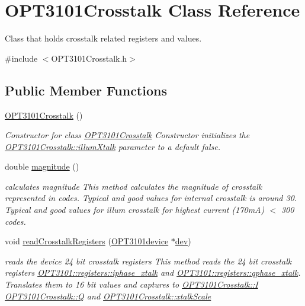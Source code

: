 \hypertarget{class_o_p_t3101_crosstalk}{}\section{O\+P\+T3101\+Crosstalk Class Reference}
\label{class_o_p_t3101_crosstalk}


Class that holds crosstalk related registers and values.  




{\ttfamily \#include $<$O\+P\+T3101\+Crosstalk.\+h$>$}

\subsection*{Public Member Functions}
\begin{DoxyCompactItemize}
\item 
\mbox{\hyperlink{class_o_p_t3101_crosstalk_ad983772d96c500ea16d5aa01dd03ce6d}{O\+P\+T3101\+Crosstalk}} ()
\begin{DoxyCompactList}\small\item\em Constructor for class \mbox{\hyperlink{class_o_p_t3101_crosstalk}{O\+P\+T3101\+Crosstalk}} Constructor initializes the \mbox{\hyperlink{class_o_p_t3101_crosstalk_ac34c766af7381d501b1716fd8a0076db}{O\+P\+T3101\+Crosstalk\+::illum\+Xtalk}} parameter to a default false. \end{DoxyCompactList}\item 
double \mbox{\hyperlink{class_o_p_t3101_crosstalk_acb6217116c652bc7c0c84e7b86504f18}{magnitude}} ()
\begin{DoxyCompactList}\small\item\em calculates magnitude This method calculates the magnitude of crosstalk represented in codes. Typical and good values for internal crosstalk is around 30. Typical and good values for illum crosstalk for highest current (170mA) $<$ 300 codes. \end{DoxyCompactList}\item 
void \mbox{\hyperlink{class_o_p_t3101_crosstalk_a87b0ff4559660ea148e5bff1dff68331}{read\+Crosstalk\+Registers}} (\mbox{\hyperlink{class_o_p_t3101device}{O\+P\+T3101device}} $\ast$\mbox{\hyperlink{main_8cpp_ab300459c1e7c2edd49f4b7b1a120dd26}{dev}})
\begin{DoxyCompactList}\small\item\em reads the device 24 bit crosstalk registers This method reads the 24 bit crosstalk registers \mbox{\hyperlink{class_o_p_t3101_1_1registers_ae87864da6c35bed7c34ebf5f26ba4513}{O\+P\+T3101\+::registers\+::iphase\+\_\+xtalk}} and \mbox{\hyperlink{class_o_p_t3101_1_1registers_ad94d98dfb26313a9d32c5c2c0c673693}{O\+P\+T3101\+::registers\+::qphase\+\_\+xtalk}}. Translates them to 16 bit values and captures to \mbox{\hyperlink{class_o_p_t3101_crosstalk_a382c8271e35b33821b22d612466c96c7}{O\+P\+T3101\+Crosstalk\+::I}} \mbox{\hyperlink{class_o_p_t3101_crosstalk_a0454e10774015dd2e941f9284ea516da}{O\+P\+T3101\+Crosstalk\+::Q}} and \mbox{\hyperlink{class_o_p_t3101_crosstalk_a5a84d979d127f7624e6f19830b739d5e}{O\+P\+T3101\+Crosstalk\+::xtalk\+Scale}} \end{DoxyCompactList}\item 

\end{DoxyCompactItemize}
